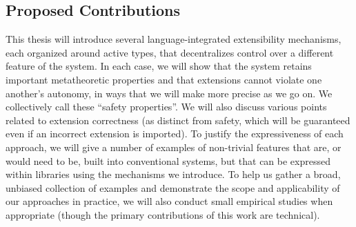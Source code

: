 

\subsection{Proposed Contributions}
This thesis will introduce several language-integrated extensibility mechanisms, each organized around active types, that decentralizes control over a different feature of the system. In each case, we will show that the system retains important metatheoretic properties and that extensions cannot violate one another's autonomy, in ways that we will make more precise as we go on. We collectively call these ``safety properties''. We will also discuss various points related to extension correctness (as distinct from safety, which will be guaranteed even if an incorrect extension is imported). To justify the  expressiveness of each approach, we will give a number of examples of non-trivial features that are, or would need to be, built into conventional systems, but that can be expressed within libraries using the mechanisms we introduce. To help us gather a broad, unbiased collection of examples and demonstrate the scope and applicability of our approaches in practice, we will also conduct small empirical studies when appropriate (though the primary contributions of this work are technical).

